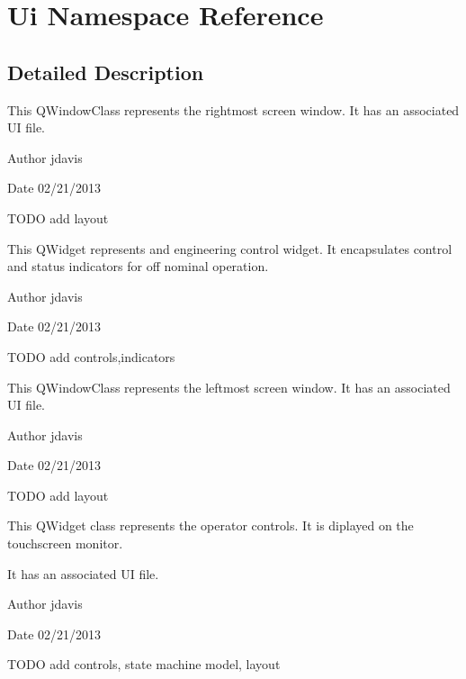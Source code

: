\hypertarget{namespaceUi}{\section{Ui Namespace Reference}
\label{namespaceUi}
}


\subsection{Detailed Description}
This Q\-Window\-Class represents the rightmost screen window. It has an associated U\-I file.

\begin{DoxyAuthor}{Author}
jdavis 
\end{DoxyAuthor}
\begin{DoxyDate}{Date}
02/21/2013
\end{DoxyDate}
T\-O\-D\-O add layout

This Q\-Widget represents and engineering control widget. It encapsulates control and status indicators for off nominal operation.

\begin{DoxyAuthor}{Author}
jdavis 
\end{DoxyAuthor}
\begin{DoxyDate}{Date}
02/21/2013
\end{DoxyDate}
T\-O\-D\-O add controls,indicators

This Q\-Window\-Class represents the leftmost screen window. It has an associated U\-I file.

\begin{DoxyAuthor}{Author}
jdavis 
\end{DoxyAuthor}
\begin{DoxyDate}{Date}
02/21/2013
\end{DoxyDate}
T\-O\-D\-O add layout

This Q\-Widget class represents the operator controls. It is diplayed on the touchscreen monitor.

It has an associated U\-I file.

\begin{DoxyAuthor}{Author}
jdavis 
\end{DoxyAuthor}
\begin{DoxyDate}{Date}
02/21/2013
\end{DoxyDate}
T\-O\-D\-O add controls, state machine model, layout 